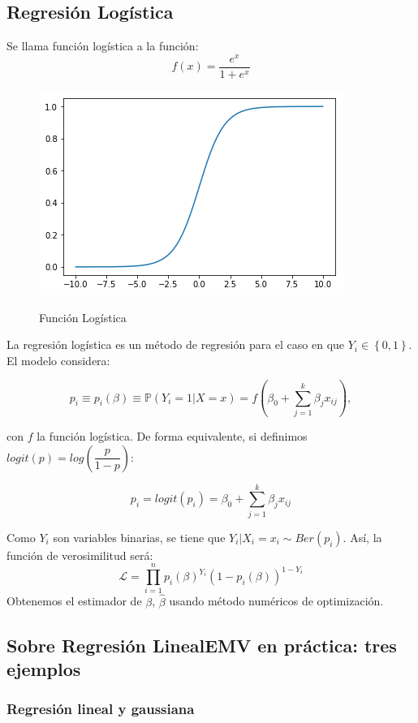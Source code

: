 \subsection{Regresión Logística}

\begin{definition}
Se llama función logística a la función: 
$$
f(x)=\dfrac{e^x}{1+e^x}
$$
\end{definition}
\begin{figure}[h]
    \centering
    \includegraphics[scale=0.65]{img/funcion_logistica.png}
    \label{fig:logistica}
    \caption{Función Logística}
\end{figure}
La regresión logística es un método de regresión para el caso en que $Y_i \in \left \{0,1 \right \}$. El modelo considera: 

$$
p_i \equiv p_i(\beta) \equiv \mathbb{P}(Y_i=1 | X=x)= f(\beta_0+\sum_{j=1}^{k}\beta_{j} x_{ij}),
$$ 

con $f$ la función logística. De forma equivalente, si definimos $logit(p)=log(\dfrac{p}{1-p})$: 

$$
p_i=logit(p_i)= \beta_0+\sum_{j=1}^{k}\beta_j x_{ij}
$$

Como $Y_i$ son variables binarias, se tiene que   $Y_i|X_i=x_i \sim Ber(p_i)$. Así, la función de verosimilitud será:
$$
\mathcal{L}=\prod_{i=1}^{n} p_i(\beta)^{Y_i}(1-p_i(\beta))^{1-Y_i}
$$
Obtenemos el estimador de $\beta$, $\hat{\beta}$ usando método numéricos de optimización. 

\subsection{Sobre Regresión LinealEMV en práctica: tres ejemplos}
\label{sub:MV_tres_ejemplos}

\subsubsection{Regresión lineal y gaussiana} 
\label{sub:reg_lin}



